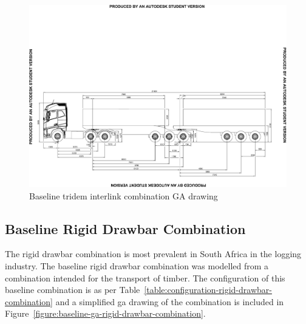 \begin{landscape}\centering
	\vspace*{\fill}
\begin{figure}[H]
	\centering
	\includegraphics[width=1.3\textwidth]{fig/baseline_ga_tridem-interlink}
	\caption{Baseline tridem interlink combination GA drawing}
	\label{figure:baseline-ga-tridem-interlink}
\end{figure}
	\vfill
\end{landscape}

\restoregeometry

\subsection{Baseline Rigid Drawbar Combination}\label{section:baseline-rigid-drawbar-combination}

The rigid drawbar combination is most prevalent in South Africa in the logging industry. The baseline rigid drawbar combination was modelled from a combination intended for the transport of timber. The configuration of this baseline combination is as per Table~\ref{table:configuration-rigid-drawbar-combination} and a simplified \gls{ga} drawing of the combination is included in Figure~\ref{figure:baseline-ga-rigid-drawbar-combination}.


